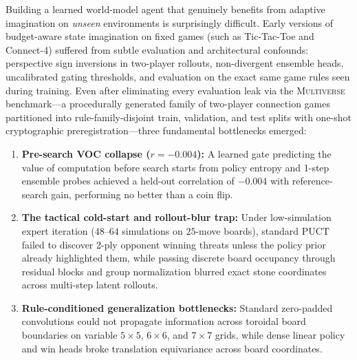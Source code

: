 \documentclass[preprint,3p,times]{elsarticle}
\begin{document}
Building a learned world-model agent that genuinely benefits from adaptive imagination on \emph{unseen} environments is surprisingly difficult. Early versions of budget-aware state imagination on fixed games (such as Tic-Tac-Toe and Connect-4) suffered from subtle evaluation and architectural confounds: perspective sign inversions in two-player rollouts, non-divergent ensemble heads, uncalibrated gating thresholds, and evaluation on the exact same game rules seen during training. Even after eliminating every evaluation leak via the \textsc{Multiverse} benchmark---a procedurally generated family of two-player connection games partitioned into rule-family-disjoint train, validation, and test splits with one-shot cryptographic preregistration---three fundamental bottlenecks emerged:
\begin{enumerate}
    \item \textbf{Pre-search VOC collapse ($r = -0.004$):} A learned gate predicting the value of computation before search starts from policy entropy and 1-step ensemble probes achieved a held-out correlation of $-0.004$ with reference-search gain, performing no better than a coin flip.
    \item \textbf{The tactical cold-start and rollout-blur trap:} Under low-simulation expert iteration ($48$--$64$ simulations on $25$-move boards), standard PUCT failed to discover 2-ply opponent winning threats unless the policy prior already highlighted them, while passing discrete board occupancy through residual blocks and group normalization blurred exact stone coordinates across multi-step latent rollouts.
    \item \textbf{Rule-conditioned generalization bottlenecks:} Standard zero-padded convolutions could not propagate information across toroidal board boundaries on variable $5\times 5$, $6\times 6$, and $7\times 7$ grids, while dense linear policy and win heads broke translation equivariance across board coordinates.
\end{enumerate}
\end{document}
